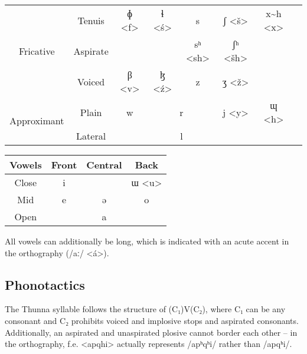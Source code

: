 \documentclass[11pt]{article} %
\begin{document}
\begin{center}
\begin{adjustbox}{width={\textwidth},totalheight={\textheight},keepaspectratio}
\begin{tabular}{|c|c||c|c|c|c|c|c|}
				\multirow{3}{*}{Fricative} & Tenuis                & ɸ <f>                     & ɬ <ś>           & s           & ʃ <š>                      & x\textasciitilde{}h <x> &                        \\ \cline{2-8}
										   & Aspirate              &                           &                 & sʰ <sh>     & ʃʰ <šh>                    &                         &                        \\ \cline{2-8}
										   & Voiced                & β <v>                     & ɮ <ź>           & z           & ʒ <ž>                      &                         &                        \\ \hline
										   
				\multirow{2}{*}{Approximant} & Plain               & w                         & \multicolumn{2}{c|}{r}        & j <y>                      & ɰ <h>                  &                         \\ \cline{2-8}
											 & Lateral             &                           & \multicolumn{2}{c|}{l}        &                            &                        &                         \\ \hline				
			\end{tabular}
			\end{adjustbox}
			
			\medskip
					
			\begin{tabular}{|c||c|c|c|}
				\hline
				\textbf{Vowels} & Front & Central & Back  \\ \hline\hline
				Close           & i     &         & ɯ <u> \\ \hline
				Mid             & e     & ə       & o     \\ \hline 
				Open            &       & a       &       \\ \hline
			\end{tabular}
		
		\end{center}

	All vowels can additionally be long, which is indicated with an acute accent in the orthography (/aː/ <á>).

	\subsection{Phonotactics}
	The Thunna syllable follows the structure of (C₁)V(C₂), where C₁ can be any consonant and C₂ prohibits voiced and implosive stops and aspirated consonants.\\
	Additionally, an aspirated and unaspirated plosive cannot border each other -- in the orthography, f.e. <apqhi> actually represents /apʰqʰi/ rather than /apqʰi/.
\end{document}
